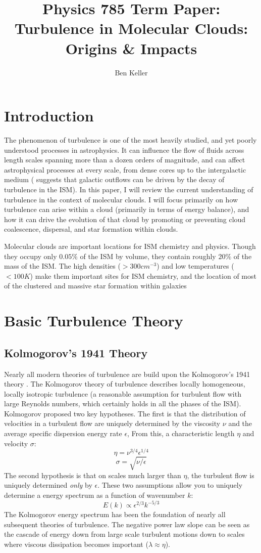 \documentclass[12pt, preprint]{aastex}
\begin{document}
\title{Physics 785 Term Paper: Turbulence in Molecular Clouds: Origins \&
Impacts}
\author{Ben Keller}
\maketitle
\newpage
\section{Introduction}
The phenomenon of turbulence is one of the most heavily studied, and yet poorly
understood processes in astrophysics.  It can influence the flow of fluids across
length scales spanning more than a dozen orders of magnitude, and can affect
astrophysical processes at every scale, from dense cores \citep{larson1981} up to the intergalactic
medium (\citet{scan2013} suggests that galactic outflows can be
driven by the decay of turbulence in the ISM).  In this paper, I will review 
the current understanding of turbulence in the context of molecular clouds.  I
will focus primarily on how turbulence can arise within a cloud (primarily in terms of
energy balance), and how it can drive the evolution of that cloud by promoting
or preventing cloud coalescence, dispersal, and star formation within clouds.

Molecular clouds are important locations for ISM chemistry and physics.  Though
they occupy only $0.05\%$ of the ISM by volume, they contain roughly $20\%$ of
the mass of the ISM.  The high densities ($>300 cm^{-3}$) and low temperatures
($<100K$) make them important sites for ISM chemistry, and the location of most of
the clustered and massive star formation within galaxies\citep{tiel2010}

\section{Basic Turbulence Theory}
\subsection{Kolmogorov's 1941 Theory}
Nearly all modern theories of turbulence are build upon the Kolmogorov's 1941
theory \citep{kolm1991}.  The Kolmogorov theory of turbulence describes locally
homogeneous, locally isotropic turbulence (a reasonable assumption for turbulent
flow with large Reynolds numbers, which certainly holds in all the phases of the
ISM).  Kolmogorov proposed two key hypotheses. The first is that the distribution 
of velocities in a turbulent flow are uniquely determined by the viscosity 
$\nu$ and the average specific dispersion energy rate $\epsilon$,  From 
this, a characteristic length $\eta$ and velocity $\sigma$:
$$\eta = \nu^{3/4}\epsilon^{1/4}$$
$$\sigma = \sqrt{\nu/\epsilon}$$
The second hypothesis is that on scales much larger than $\eta$, the turbulent flow
is uniquely determined \textit{only} by $\epsilon$.  These two assumptions
allow you to uniquely determine a energy spectrum as a function of wavenumber
$k$:
$$E(k) \propto \epsilon^{2/3}k^{-5/3}$$
The Kolmogorov energy spectrum has been the foundation of nearly all subsequent
theories of turbulence.  The negative power law slope can be seen as the cascade
of energy down from large scale turbulent motions down to scales where viscous
dissipation becomes important ($\lambda \approx \eta$).
\end{document}
